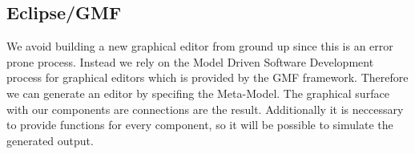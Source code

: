 	  \subsection{Eclipse/GMF}
		We avoid building a new graphical editor from ground up since this is an error prone process. Instead we rely on the Model Driven Software Development process for graphical editors which is provided by the GMF framework. Therefore we can generate an editor by specifing the Meta-Model. The graphical surface with our components are connections are the result. Additionally it is neccessary to provide functions for every component, so it will be possible to simulate the generated output.
      